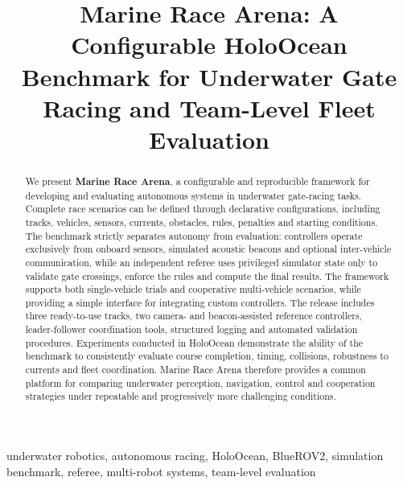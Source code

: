 \documentclass[conference]{IEEEtran}
\newcommand{\mra}{Marine Race Arena}
\begin{document}
\title{\mra: A Configurable HoloOcean Benchmark for Underwater Gate Racing and Team-Level Fleet Evaluation}

\author{
}

\maketitle

\begin{abstract}
We present \textbf{Marine Race Arena}, a configurable and reproducible framework for developing and evaluating autonomous systems in underwater gate-racing tasks. Complete race scenarios can be defined through declarative configurations, including tracks, vehicles, sensors, currents, obstacles, rules, penalties and starting conditions. The benchmark strictly separates autonomy from evaluation: controllers operate exclusively from onboard sensors, simulated acoustic beacons and optional inter-vehicle communication, while an independent referee uses privileged simulator state only to validate gate crossings, enforce the rules and compute the final results. The framework supports both single-vehicle trials and cooperative multi-vehicle scenarios, while providing a simple interface for integrating custom controllers. The release includes three ready-to-use tracks, two camera- and beacon-assisted reference controllers, leader-follower coordination tools, structured logging and automated validation procedures. Experiments conducted in HoloOcean demonstrate the ability of the benchmark to consistently evaluate course completion, timing, collisions, robustness to currents and fleet coordination. Marine Race Arena therefore provides a common platform for comparing underwater perception, navigation, control and cooperation strategies under repeatable and progressively more challenging conditions.
\end{abstract}

\begin{IEEEkeywords}
underwater robotics, autonomous racing, HoloOcean, BlueROV2, simulation benchmark, referee, multi-robot systems, team-level evaluation
\end{IEEEkeywords}














\end{document}
